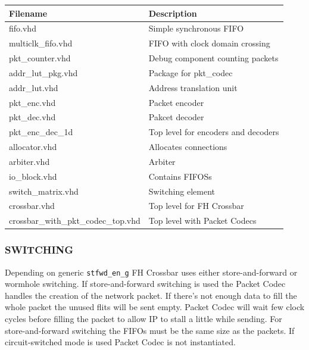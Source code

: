 \documentclass[a4paper,10pt,oneside,final]{article}
\def\deftablecolora{blue!10!white}
\def\deftablecolorb{white}
\begin{document}
\begin{center}
  \rowcolors{3}{\deftablecolora}{\deftablecolorb}

  \label{tab:files}
  \begin{tabularx}{\textwidth}{|lX|}
    \hline
    Filename   & Description\\
    \hline
    fifo.vhd           & Simple synchronous FIFO\\
    multiclk\_fifo.vhd & FIFO with clock domain crossing\\
    pkt\_counter.vhd   & Debug component counting packets\\   
    addr\_lut\_pkg.vhd & Package for pkt\_codec\\
    addr\_lut.vhd      & Address translation unit\\
    pkt\_enc.vhd       & Packet encoder\\
    pkt\_dec.vhd       & Pakcet decoder\\
    pkt\_enc\_dec\_1d  & Top level for encoders and decoders\\    
    allocator.vhd      & Allocates connections\\
    arbiter.vhd        & Arbiter\\
    io\_block.vhd      & Contains FIFOSs\\
    switch\_matrix.vhd & Switching element\\
    crossbar.vhd       & Top level for FH Crossbar\\
    crossbar\_with\_pkt\_codec\_top.vhd & Top level with Packet Codecs\\
    \hline
  \end{tabularx}  
\end{center}


\subsubsection{SWITCHING}

Depending on generic \texttt{stfwd\_en\_g} FH Crossbar uses either
store-and-forward or wormhole switching. If store-and-forward
switching is used the Packet Codec handles the creation of the network
packet. If there's not enough data to fill the whole packet the unused
flits will be sent empty. Packet Codec will wait few clock cycles
before filling the packet to allow IP to stall a little while
sending. For store-and-forward switching the FIFOs must be the same
size as the packets. If circuit-switched mode is used Packet Codec is
not instantiated.
\end{document}
